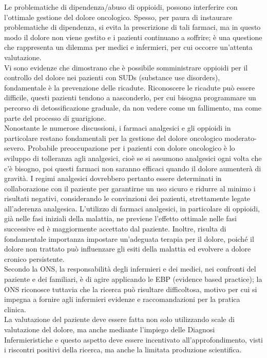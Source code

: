 Le problematiche di dipendenza/abuso di oppioidi, possono interferire con l’ottimale gestione del dolore oncologico. 
Spesso, per paura di instaurare problematiche di dipendenza, si evita la prescrizione di tali farmaci, 
ma in questo modo il dolore non viene gestito e i pazienti continuano a soffrire; 
è una questione che rappresenta un dilemma per medici e infermieri, per cui occorre un’attenta valutazione\cite{PAINONS}.\\ 
Vi sono evidenze che dimostrano che è possibile somministrare oppioidi per il controllo del dolore nei pazienti con SUDs 
(substance use disorders), fondamentale è la prevenzione delle ricadute. Riconoscere le ricadute può essere difficile, 
questi pazienti tendono a nasconderlo, per cui bisogna programmare un percorso di detossificazione graduale, 
da non vedere come un fallimento, ma come parte del processo di guarigione\cite{CANCERPAINONS}.\\
Nonostante le numerose discussioni, i farmaci analgesici e gli oppioidi in particolare restano fondamentali per 
la gestione del dolore oncologico moderato-severo. Probabile preoccupazione per i pazienti con dolore oncologico 
è lo sviluppo di tolleranza agli analgesici, cioè se si assumono analgesici ogni volta che c’è bisogno, poi questi 
farmaci non saranno efficaci quando il dolore aumenterà di gravità. I regimi analgesici dovrebbero pertanto essere 
determinati in collaborazione con il paziente per garantirne un uso sicuro e ridurre al minimo i risultati negativi, 
considerando le convinzioni dei pazienti, strettamente legate all’aderenza analgesica\cite{analgesici}. L’utilizzo di 
farmaci analgesici, in particolare di oppioidi, già nelle fasi iniziali della malattia, ne previene l’effetto ottimale 
nelle fasi successive ed è maggiormente accettato dal paziente. Inoltre, risulta di fondamentale importanza impostare 
un’adeguata terapia per il dolore, poiché il dolore non trattato può influenzare gli esiti della malattia ed evolvere 
a dolore cronico persistente.\\ 

Secondo la ONS, la responsabilità degli infermieri e dei medici, nei confronti del paziente e dei familiari, 
è di agire applicando le EBP (evidence based practice); la ONS riconosce tuttavia che la ricerca 
può risultare difficoltosa, motivo per cui si impegna a fornire agli infermieri 
evidenze e raccomandazioni per la pratica clinica\cite{PAINONS}.\\
La valutazione del paziente deve essere fatta non solo utilizzando scale di valutazione del dolore, ma anche 
mediante l’impiego delle Diagnosi Infermieristiche e questo aspetto deve essere 
incentivato all’approfondimento, visti i riscontri positivi della ricerca, ma anche la limitata 
produzione scientifica.

